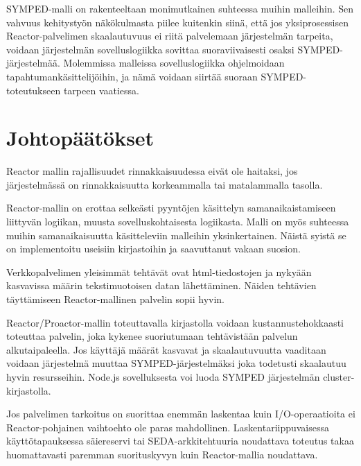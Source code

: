 \documentclass[finnish]{tktltiki2}
\theoremstyle{definition}
\theoremstyle{remark}
\begin{document}
SYMPED-malli on rakenteeltaan monimutkainen suhteessa muihin malleihin.
Sen vahvuus kehitystyön näkökulmasta piilee kuitenkin siinä, että
jos yksiprosessisen Reactor-palvelimen skaalautuvuus ei riitä palvelemaan
järjestelmän tarpeita, voidaan järjestelmän sovelluslogiikka
sovittaa suoraviivaisesti osaksi SYMPED-järjestelmää. Molemmissa malleissa
sovelluslogiikka ohjelmoidaan tapahtumankäsittelijöihin, ja nämä voidaan siirtää
suoraan SYMPED-toteutukseen tarpeen vaatiessa.


\section{Johtopäätökset}

Reactor mallin rajallisuudet rinnakkaisuudessa
eivät ole haitaksi, jos järjestelmässä on rinnakkaisuutta
korkeammalla tai matalammalla tasolla.

Reactor-mallin on erottaa
selkeästi pyyntöjen käsittelyn
samanaikaistamiseen liittyvän
logiikan, muusta sovelluskohtaisesta logiikasta.
Malli on myös suhteessa muihin samanaikaisuutta
käsitteleviin malleihin yksinkertainen.
Näistä syistä se on implementoitu useisiin
kirjastoihin ja saavuttanut vakaan suosion.

Verkkopalvelimen yleisimmät tehtävät ovat 
html-tiedostojen ja nykyään kasvavissa määrin
tekstimuotoisen datan lähettäminen. 
Näiden tehtävien täyttämiseen Reactor-mallinen
palvelin sopii hyvin.

Reactor/Proactor-mallin toteuttavalla
kirjastolla voidaan kustannustehokkaasti
toteuttaa palvelin, joka kykenee suoriutumaan
tehtävistään palvelun alkutaipaleella. Jos
käyttäjä määrät kasvavat ja skaalautuvuutta
vaaditaan voidaan järjestelmä muuttaa SYMPED-järjestelmäksi
joka todetusti skaalautuu hyvin resursseihin.
Node.js sovelluksesta voi luoda SYMPED järjestelmän
cluster-kirjastolla.

Jos palvelimen tarkoitus on suorittaa enemmän laskentaa kuin
I/O-operaatioita ei Reactor-pohjainen vaihtoehto ole paras mahdollinen.
Laskentariippuvaisessa käyttötapauksessa säiereservi tai SEDA-arkkitehtuuria
noudattava toteutus takaa huomattavasti paremman suorituskyvyn kuin
Reactor-mallia noudattava.




\end{document}

